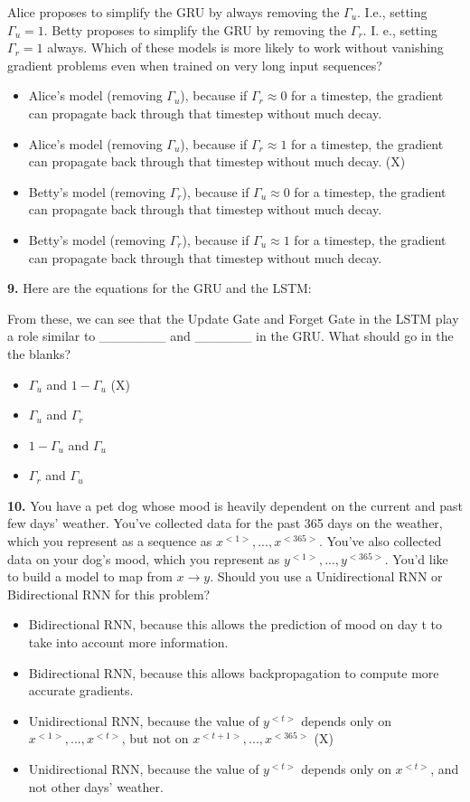 Alice proposes to simplify the GRU by always removing the $\Gamma_u$. I.e., setting $\Gamma_u = 1$. Betty proposes to simplify the GRU by removing the $\Gamma_r$. I. e., setting $\Gamma_r = 1$ always. Which of these models is more likely to work without vanishing gradient problems even when trained on very long input sequences?
\begin{itemize}
    \item Alice’s model (removing $\Gamma_u$), because if $\Gamma_r \approx 0$ for a timestep, the gradient can propagate back through that timestep without much decay.
    \item Alice’s model (removing $\Gamma_u$), because if $\Gamma_r \approx 1$ for a timestep, the gradient can propagate back through that timestep without much decay. (X)
    \item Betty’s model (removing $\Gamma_r$), because if $\Gamma_u \approx 0$ for a timestep, the gradient can propagate back through that timestep without much decay.
    \item Betty’s model (removing $\Gamma_r$), because if $\Gamma_u \approx 1$ for a timestep, the gradient can propagate back through that timestep without much decay.
\end{itemize}
\textbf{9.} Here are the equations for the GRU and the LSTM:

From these, we can see that the Update Gate and Forget Gate in the LSTM play a role similar to \_\_\_\_\_\_\_ and \_\_\_\_\_\_ in the GRU. What should go in the the blanks?
\begin{itemize}
    \item $\Gamma_u$ and $1-\Gamma_u$ (X)
    \item $\Gamma_u$ and $\Gamma_r$
    \item $1-\Gamma_u$ and $\Gamma_u$
    \item $\Gamma_r$ and $\Gamma_u$
\end{itemize}
\textbf{10.} You have a pet dog whose mood is heavily dependent on the current and past few days’ weather. You’ve collected data for the past 365 days on the weather, which you represent as a sequence as $x^{<1>}, ..., x^{<365>}$. You’ve also collected data on your dog’s mood, which you represent as $y^{<1>}, ..., y^{<365>}$. You’d like to build a model to map from $x \rightarrow y$. Should you use a Unidirectional RNN or Bidirectional RNN for this problem?
\begin{itemize}
    \item Bidirectional RNN, because this allows the prediction of mood on day t to take into account more information.
    \item Bidirectional RNN, because this allows backpropagation to compute more accurate gradients.
    \item Unidirectional RNN, because the value of $y^{<t>}$ depends only on $x^{<1>}, ..., x^{<t>}$, but not on $x^{<t+1>}, ..., x^{<365>}$ (X)
    \item Unidirectional RNN, because the value of $y^{<t>}$ depends only on $x^{<t>}$, and not other days’ weather.
\end{itemize}